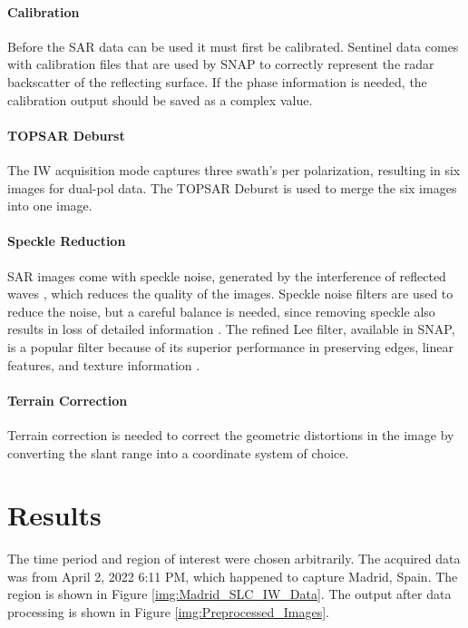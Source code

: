 \documentclass[conference]{IEEEtran}
\begin{document}
	\paragraph{Calibration}
	Before the SAR data can be used it must first be calibrated. 
	Sentinel data comes with calibration files that are used by SNAP to correctly represent the radar backscatter of the reflecting surface.
	If the phase information is needed, the calibration output should be saved as a complex value.

	\paragraph{TOPSAR Deburst}
	The IW acquisition mode captures three swath's per polarization, resulting in six images for dual-pol data.
	The TOPSAR Deburst is used to merge the six images into one image.
	
	\paragraph{Speckle Reduction}
	SAR images come with speckle noise, generated by the interference of reflected waves \cite{Filipponi_2019}, which reduces the quality of the images.
	Speckle noise filters are used to reduce the noise, but a careful balance is needed, since removing speckle also results in loss of detailed information \cite{Yommy_2015}. 
	The refined Lee filter, available in SNAP, is a popular filter because of its superior performance in preserving edges, linear features, and texture information \cite{Filipponi_2019}.
	
	\paragraph{Terrain Correction}
	Terrain correction is needed to correct the geometric distortions in the image by converting the slant range into a coordinate system of choice.

	\section{Results}
	The time period and region of interest were chosen arbitrarily. 
	The acquired data was from April 2, 2022 6:11 PM, which happened to capture Madrid, Spain. 
	The region is shown in Figure \ref{img:Madrid_SLC_IW_Data}. 
	The output after data processing is shown in Figure \ref{img:Preprocessed_Images}.
	
\end{document}
